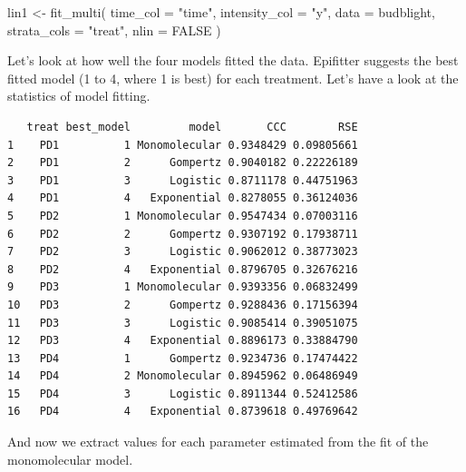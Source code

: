 \documentclass[
  letterpaper,
  DIV=11,
  numbers=noendperiod]{scrreprt}
\newenvironment{Shaded}{\begin{snugshade}}{\end{snugshade}}
\newcommand{\AttributeTok}[1]{\textcolor[rgb]{0.40,0.45,0.13}{#1}}
\newcommand{\ConstantTok}[1]{\textcolor[rgb]{0.56,0.35,0.01}{#1}}
\newcommand{\FunctionTok}[1]{\textcolor[rgb]{0.28,0.35,0.67}{#1}}
\newcommand{\NormalTok}[1]{\textcolor[rgb]{0.00,0.23,0.31}{#1}}
\newcommand{\OtherTok}[1]{\textcolor[rgb]{0.00,0.23,0.31}{#1}}
\newcommand{\SpecialCharTok}[1]{\textcolor[rgb]{0.37,0.37,0.37}{#1}}
\newcommand{\StringTok}[1]{\textcolor[rgb]{0.13,0.47,0.30}{#1}}
\begin{document}
\begin{Shaded}
\begin{Highlighting}[]
\NormalTok{lin1 }\OtherTok{\textless{}{-}} \FunctionTok{fit\_multi}\NormalTok{(}
  \AttributeTok{time\_col =} \StringTok{"time"}\NormalTok{,}
  \AttributeTok{intensity\_col =} \StringTok{"y"}\NormalTok{,}
  \AttributeTok{data =}\NormalTok{ budblight,}
  \AttributeTok{strata\_cols =} \StringTok{"treat"}\NormalTok{,}
  \AttributeTok{nlin =} \ConstantTok{FALSE}
\NormalTok{)}
\end{Highlighting}
\end{Shaded}

Let's look at how well the four models fitted the data. Epifitter
suggests the best fitted model (1 to 4, where 1 is best) for each
treatment. Let's have a look at the statistics of model fitting.

\begin{Shaded}
\end{Shaded}

\begin{verbatim}
   treat best_model         model       CCC        RSE
1    PD1          1 Monomolecular 0.9348429 0.09805661
2    PD1          2      Gompertz 0.9040182 0.22226189
3    PD1          3      Logistic 0.8711178 0.44751963
4    PD1          4   Exponential 0.8278055 0.36124036
5    PD2          1 Monomolecular 0.9547434 0.07003116
6    PD2          2      Gompertz 0.9307192 0.17938711
7    PD2          3      Logistic 0.9062012 0.38773023
8    PD2          4   Exponential 0.8796705 0.32676216
9    PD3          1 Monomolecular 0.9393356 0.06832499
10   PD3          2      Gompertz 0.9288436 0.17156394
11   PD3          3      Logistic 0.9085414 0.39051075
12   PD3          4   Exponential 0.8896173 0.33884790
13   PD4          1      Gompertz 0.9234736 0.17474422
14   PD4          2 Monomolecular 0.8945962 0.06486949
15   PD4          3      Logistic 0.8911344 0.52412586
16   PD4          4   Exponential 0.8739618 0.49769642
\end{verbatim}

And now we extract values for each parameter estimated from the fit of
the monomolecular model.

\begin{Shaded}
\end{Shaded}
\end{document}
